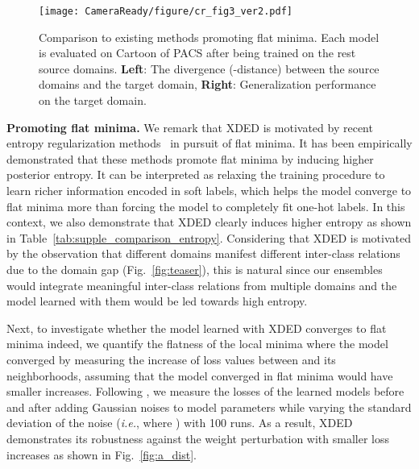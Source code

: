 \documentclass[runningheads]{llncs}
\def\ie{\emph{i.e.}}
\begin{document}
\begin{figure*}[t]
    \centering
    \texttt{[image: CameraReady/figure/cr\_fig3\_ver2.pdf]}
\caption{
    Comparison to existing methods promoting flat minima. Each model is evaluated on Cartoon of PACS after being trained on the rest source domains. \textbf{Left}: The divergence (-distance) between the source domains and the target domain, \textbf{Right}: Generalization performance on the target domain.
    }
    \label{fig:supple_a_dist}
\end{figure*}

\noindent \textbf{Promoting flat minima.} 
We remark that XDED is motivated by recent entropy regularization methods~\cite{cha2020cpr,zhang2019your,zhang2018deep} in pursuit of flat minima. It has been empirically demonstrated that these methods promote flat minima by inducing higher posterior entropy. It can be interpreted as relaxing the training procedure to learn richer information encoded in soft labels, which helps the model converge to flat minima more than forcing the model to completely fit one-hot labels. In this context, we also demonstrate that XDED clearly induces higher entropy as shown in Table~\ref{tab:supple_comparison_entropy}. Considering that XDED is motivated by the observation that different domains manifest different inter-class relations due to the domain gap (Fig.~\ref{fig:teaser}), this is natural since our ensembles would integrate meaningful inter-class relations from multiple domains and the model learned with them would be led towards high entropy.

Next, to investigate whether the model learned with XDED converges to flat minima indeed, we quantify the flatness of the local minima where the model converged by measuring the increase of loss values between  and its neighborhoods, assuming that the model converged in flat minima would have smaller increases. Following \cite{cha2021swad,cha2020cpr,zhang2019your,zhang2018deep}, we measure the losses of the learned models before and after adding Gaussian noises to model parameters while varying the standard deviation of the noise  (\ie,  where ) with 100 runs. As a result, XDED demonstrates its robustness against the weight perturbation with smaller loss increases as shown in Fig.~\ref{fig:a_dist}. 
\end{document}
